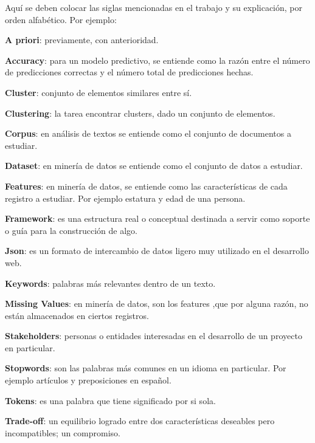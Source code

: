 
Aquí se deben colocar las siglas mencionadas en el trabajo y su explicación, por orden alfabético. Por ejemplo: \\

{\setlength{\parskip}{0cm} %
\textbf{A priori}: previamente, con anterioridad.

\textbf{Accuracy}: para un modelo predictivo, se entiende como la razón entre el número de predicciones correctas y el número total de predicciones hechas.

\textbf{Cluster}: conjunto de elementos similares entre sí.

\textbf{Clustering}: la tarea encontrar clusters, dado un conjunto de elementos.

\textbf{Corpus}: en análisis de textos se entiende como el conjunto de documentos a estudiar.

\textbf{Dataset}: en minería de datos se entiende como el conjunto de datos a estudiar. 

\textbf{Features}: en minería de datos, se entiende como las características de cada registro a estudiar. Por ejemplo estatura y edad de una persona.

\textbf{Framework}: es una estructura real o conceptual destinada a servir como soporte o guía para la construcción de algo.

\textbf{Json}: es un formato de intercambio de datos ligero muy utilizado en el desarrollo web.

\textbf{Keywords}: palabras más relevantes dentro de un texto.

\textbf{Missing Values}: en minería de datos, son los features ,que por alguna razón, no están almacenados en ciertos registros.

\textbf{Stakeholders}: personas o entidades interesadas en el desarrollo de un proyecto en particular.

\textbf{Stopwords}: son las palabras más comunes en un idioma en particular. Por ejemplo artículos y preposiciones en español.

\textbf{Tokens}: es una palabra que tiene significado por si sola.

\textbf{Trade-off}: un equilibrio logrado entre dos características deseables pero incompatibles; un compromiso.
}
